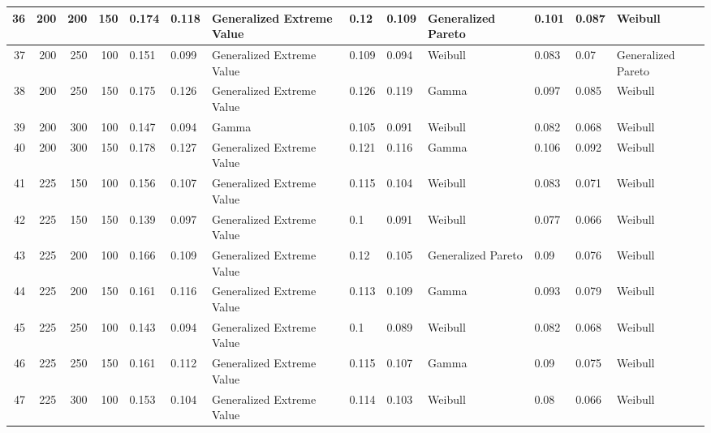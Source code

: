 \begin{table}[H]
{{\begin{tabular}{|r|r|r|r|l|l|l|l|l|l|l|l|l|}
    36 & 200 & 200 & 150 & \cellcolor[HTML]{64B0AC}0.174 & \cellcolor[HTML]{64ABAB}0.118 & Generalized Extreme Value & 0.12  & 0.109 & Generalized Pareto & 0.101 & 0.087 & Weibull            \\ \hline
    37 & 200 & 250 & 100 & \cellcolor[HTML]{617FA5}0.151 & \cellcolor[HTML]{6076A4}0.099 & Generalized Extreme Value & 0.109 & 0.094 & Weibull            & 0.083 & 0.07  & Generalized Pareto \\ \hline
    38 & 200 & 250 & 150 & \cellcolor[HTML]{64B4AC}0.175 & \cellcolor[HTML]{65C0AE}0.126 & Generalized Extreme Value & 0.126 & 0.119 & Gamma              & 0.097 & 0.085 & Weibull            \\ \hline
    39 & 200 & 300 & 100 & \cellcolor[HTML]{6178A4}0.147 & \cellcolor[HTML]{6069A3}0.094 & Gamma                     & 0.105 & 0.091 & Weibull            & 0.082 & 0.068 & Weibull            \\ \hline
    40 & 200 & 300 & 150 & \cellcolor[HTML]{65B9AD}0.178 & \cellcolor[HTML]{6AC2AE}0.127 & Generalized Extreme Value & 0.121 & 0.116 & Gamma              & 0.106 & 0.092 & Weibull            \\ \hline
    41 & 225 & 150 & 100 & \cellcolor[HTML]{628BA7}0.156 & \cellcolor[HTML]{628FA7}0.107 & Generalized Extreme Value & 0.115 & 0.104 & Weibull            & 0.083 & 0.071 & Weibull            \\ \hline
    42 & 225 & 150 & 150 & \cellcolor[HTML]{5F66A2}0.139 & \cellcolor[HTML]{6072A4}0.097 & Generalized Extreme Value & 0.1   & 0.091 & Weibull            & 0.077 & 0.066 & Weibull            \\ \hline
    43 & 225 & 200 & 100 & \cellcolor[HTML]{639EAA}0.166 & \cellcolor[HTML]{6292A8}0.109 & Generalized Extreme Value & 0.12  & 0.105 & Generalized Pareto & 0.09  & 0.076 & Weibull            \\ \hline
    44 & 225 & 200 & 150 & \cellcolor[HTML]{6296A8}0.161 & \cellcolor[HTML]{63A6AA}0.116 & Generalized Extreme Value & 0.113 & 0.109 & Gamma              & 0.093 & 0.079 & Weibull            \\ \hline
    45 & 225 & 250 & 100 & \cellcolor[HTML]{606FA3}0.143 & \cellcolor[HTML]{6069A3}0.094 & Generalized Extreme Value & 0.1   & 0.089 & Weibull            & 0.082 & 0.068 & Weibull            \\ \hline
    46 & 225 & 250 & 150 & \cellcolor[HTML]{6296A8}0.161 & \cellcolor[HTML]{6399A9}0.112 & Generalized Extreme Value & 0.115 & 0.107 & Gamma              & 0.09  & 0.075 & Weibull            \\ \hline
    47 & 225 & 300 & 100 & \cellcolor[HTML]{6184A6}0.153 & \cellcolor[HTML]{6186A6}0.104 & Generalized Extreme Value & 0.114 & 0.103 & Weibull            & 0.08  & 0.066 & Weibull            \\ \hline 
    \end{tabular}
    
        }
        }
    \end{table}